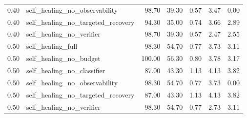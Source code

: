 \begin{tabular}{rlrrrrr}
0.40 & self_healing_no_observability & 98.70 & 39.30 & 0.57 & 3.47 & 0.00 \\
0.40 & self_healing_no_targeted_recovery & 94.30 & 35.00 & 0.74 & 3.66 & 2.89 \\
0.40 & self_healing_no_verifier & 98.70 & 39.30 & 0.57 & 2.47 & 2.55 \\
0.50 & self_healing_full & 98.30 & 54.70 & 0.77 & 3.73 & 3.11 \\
0.50 & self_healing_no_budget & 100.00 & 56.30 & 0.80 & 3.78 & 3.17 \\
0.50 & self_healing_no_classifier & 87.00 & 43.30 & 1.13 & 4.13 & 3.82 \\
0.50 & self_healing_no_observability & 98.30 & 54.70 & 0.77 & 3.73 & 0.00 \\
0.50 & self_healing_no_targeted_recovery & 87.00 & 43.30 & 1.13 & 4.13 & 3.82 \\
0.50 & self_healing_no_verifier & 98.30 & 54.70 & 0.77 & 2.73 & 3.11 \\
\bottomrule
\end{tabular}
